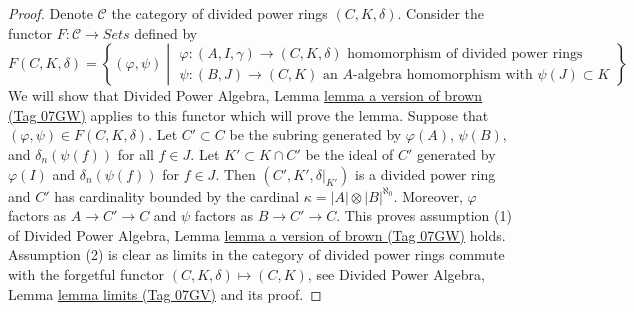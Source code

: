 \documentclass{amsart}
\theoremstyle{plain}
\theoremstyle{definition}
\theoremstyle{remark}
\numberwithin{equation}{subsection}
\begin{document}
\begin{proof}
Denote $\mathcal{C}$ the category of divided power rings
$(C, K, \delta)$. Consider the functor
$F : \mathcal{C} \longrightarrow \textit{Sets}$ defined by
$$
F(C, K, \delta) =
\left\{
(\varphi, \psi)
\middle|
\begin{matrix}
\varphi : (A, I, \gamma) \to (C, K, \delta)
\text{ homomorphism of divided power rings} \\
\psi : (B, J) \to (C, K)\text{ an }
A\text{-algebra homomorphism with }\psi(J) \subset K
\end{matrix}
\right\}
$$
We will show that
Divided Power Algebra, Lemma \href{https://stacks.math.columbia.edu/tag/07GW}{lemma a version of brown (Tag 07GW)}
applies to this functor which will
prove the lemma. Suppose that $(\varphi, \psi) \in F(C, K, \delta)$.
Let $C' \subset C$ be the subring generated by $\varphi(A)$,
$\psi(B)$, and $\delta_n(\psi(f))$ for all $f \in J$.
Let $K' \subset K \cap C'$ be the ideal of $C'$ generated by
$\varphi(I)$ and $\delta_n(\psi(f))$ for $f \in J$.
Then $(C', K', \delta|_{K'})$ is a divided power ring and
$C'$ has cardinality bounded by the cardinal
$\kappa = |A| \otimes |B|^{\aleph_0}$.
Moreover, $\varphi$ factors as $A \to C' \to C$ and $\psi$ factors
as $B \to C' \to C$. This proves assumption (1) of
Divided Power Algebra, Lemma \href{https://stacks.math.columbia.edu/tag/07GW}{lemma a version of brown (Tag 07GW)}
holds. Assumption (2) is clear
as limits in the category of divided power rings commute with the
forgetful functor $(C, K, \delta) \mapsto (C, K)$, see
Divided Power Algebra, Lemma \href{https://stacks.math.columbia.edu/tag/07GV}{lemma limits (Tag 07GV)} and its proof.
\end{proof}
\end{document}
